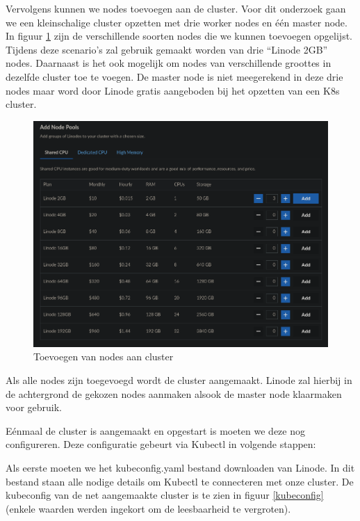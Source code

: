 Vervolgens kunnen we nodes toevoegen aan de cluster. Voor dit onderzoek gaan we een kleinschalige cluster opzetten met drie worker nodes en één master node. In figuur \ref{fig:LinodeAddNodes} zijn de verschillende soorten nodes die we kunnen toevoegen opgelijst. Tijdens deze scenario's zal gebruik gemaakt worden van drie ``Linode 2GB'' nodes. Daarnaast is het ook mogelijk om nodes van verschillende groottes in dezelfde cluster toe te voegen. De master node is niet meegerekend in deze drie nodes maar word door Linode gratis aangeboden bij het opzetten van een K8s cluster.

\begin{figure}[h]
	\centering
	\includegraphics[width=\linewidth]{img/LinodeAddNodes.png}
	\caption{Toevoegen van nodes aan cluster}
	\label{fig:LinodeAddNodes}
\end{figure}

Als alle nodes zijn toegevoegd wordt de cluster aangemaakt. Linode zal hierbij in de achtergrond de gekozen nodes aanmaken alsook de master node klaarmaken voor gebruik. 

Eénmaal de cluster is aangemaakt en opgestart is moeten we deze nog configureren. Deze configuratie gebeurt via Kubectl in volgende stappen:

Als eerste moeten we het kubeconfig.yaml bestand downloaden van Linode. In dit bestand staan alle nodige details om Kubectl te connecteren met onze cluster. De kubeconfig van de net aangemaakte cluster is te zien in figuur \ref{kubeconfig} (enkele waarden werden ingekort om de leesbaarheid te vergroten).

